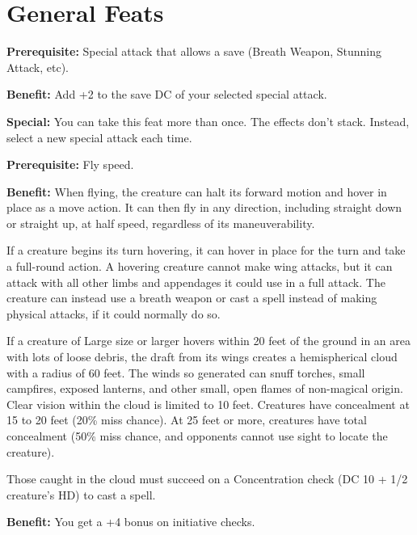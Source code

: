 \section{General Feats}


\textbf{Prerequisite:} Special attack that allows a save (Breath Weapon, Stunning Attack, etc).

\textbf{Benefit:} Add +2 to the save DC of your selected special attack.

\textbf{Special:} You can take this feat more than once. The effects don't stack. Instead, select a new special attack each time.


\textbf{Prerequisite:} Fly speed.

\textbf{Benefit:} When flying, the creature can halt its forward motion and hover in place as a move action. It can then fly in any direction, including straight down or straight up, at half speed, regardless of its maneuverability.

If a creature begins its turn hovering, it can hover in place for the turn and take a full-round action. A hovering creature cannot make wing attacks, but it can attack with all other limbs and appendages it could use in a full attack. The creature can instead use a breath weapon or cast a spell instead of making physical attacks, if it could normally do so.

If a creature of Large size or larger hovers within 20 feet of the ground in an area with lots of loose debris, the draft from its wings creates a hemispherical cloud with a radius of 60 feet. The winds so generated can snuff torches, small campfires, exposed lanterns, and other small, open flames of non-magical origin. Clear vision within the cloud is limited to 10 feet. Creatures have concealment at 15 to 20 feet (20\% miss chance). At 25 feet or more, creatures have total concealment 
(50\% miss chance, and opponents cannot use sight to locate the creature).

Those caught in the cloud must succeed on a Concentration check (DC 10 + 1/2 creature's HD) to cast a spell.


\textbf{Benefit:} You get a +4 bonus on initiative checks.

